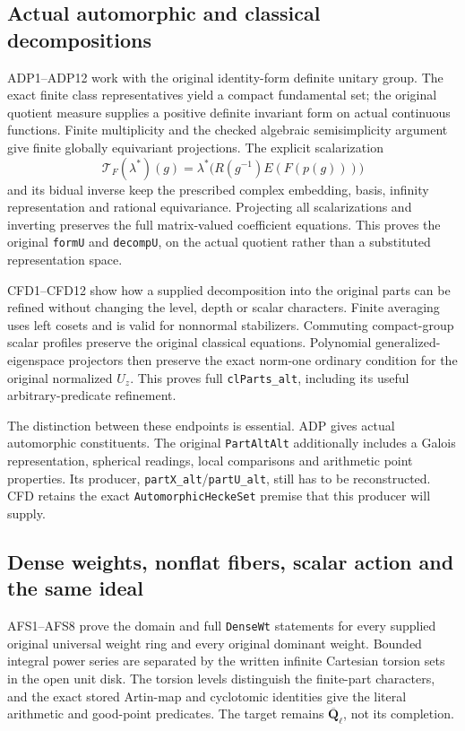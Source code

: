 \documentclass[11pt,a4paper]{article}
\numberwithin{equation}{section}
\theoremstyle{remark}\newtheorem{remark}[theorem]{Remark}
\begin{document}
\subsection{Actual automorphic and classical decompositions}

ADP1--ADP12 work with the original identity-form definite unitary group.
The exact finite class representatives yield a compact fundamental set;
the original quotient measure supplies a positive definite invariant
form on actual continuous functions. Finite multiplicity and the
checked algebraic semisimplicity argument give finite globally
equivariant projections. The explicit scalarization
\[
 \mathcal T_F(\lambda^*)(g)
  =\lambda^*\bigl(R(g^{-1})E(F(p(g)))\bigr)
\]
and its bidual inverse keep the prescribed complex embedding, basis,
infinity representation and rational equivariance. Projecting all
scalarizations and inverting preserves the full matrix-valued
coefficient equations. This proves the original \texttt{form\allowbreak U} and
\texttt{decomp\allowbreak U}, on the actual quotient rather than a substituted
representation space.

CFD1--CFD12 show how a supplied decomposition into the original parts
can be refined without changing the level, depth or scalar characters.
Finite averaging uses left cosets and is valid for nonnormal
stabilizers. Commuting compact-group scalar profiles preserve the
original classical equations. Polynomial generalized-eigenspace
projectors then preserve the exact norm-one ordinary condition for
the original normalized $U_z$. This proves full \texttt{cl\allowbreak Parts\_\allowbreak alt},
including its useful arbitrary-predicate refinement.

The distinction between these endpoints is essential. ADP gives
actual automorphic constituents. The original \texttt{Part\allowbreak Alt\allowbreak Alt}
additionally includes a Galois representation, spherical readings,
local comparisons and arithmetic point properties. Its producer,
\texttt{part\allowbreak X\_\allowbreak alt}/\texttt{part\allowbreak U\_\allowbreak alt}, still has to be reconstructed.
CFD retains the exact \texttt{Automorphic\allowbreak Hecke\allowbreak Set} premise that this
producer will supply.

\subsection{Dense weights, nonflat fibers, scalar action and the same ideal}

AFS1--AFS8 prove the domain and full \texttt{Dense\allowbreak Wt} statements for
every supplied original universal weight ring and every original
dominant weight. Bounded integral power series are separated by the
written infinite Cartesian torsion sets in the open unit disk. The
torsion levels distinguish the finite-part characters, and the exact
stored Artin-map and cyclotomic identities give the literal arithmetic
and good-point predicates. The target remains
$\overline{\mathbf Q}_\ell$, not its completion.
\end{document}
